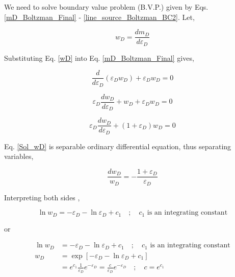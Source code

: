 \documentclass{llncs}
\numberwithin{equation}{section}
\numberwithin{figure}{section}
\numberwithin{table}{section}
\begin{document}
    We need to solve boundary value problem (B.V.P.) given by Eqs. \ref{mD_Boltzman_Final} - \ref{line_source_Boltzman_BC2}. Let,

    \begin{equation}
        {{w}_{D}}=\frac{d{{m}_{D}}}{d{{\varepsilon }_{D}}}
        \label{wD}
    \end{equation}

    Substituting Eq. \ref{wD} into Eq. \ref{mD_Boltzman_Final} gives,

    \begin{equation*}
        \frac{d}{d{{\varepsilon }_{D}}}\left( {{\varepsilon }_{D}}{{w}_{D}} \right)+{{\varepsilon }_{D}}{{w}_{D}}=0
    \end{equation*}

    \begin{equation*}
        {{\varepsilon }_{D}}\frac{d{{w}_{D}}}{d{{\varepsilon }_{D}}}+{{w}_{D}}+{{\varepsilon }_{D}}{{w}_{D}}=0
    \end{equation*}

    \begin{equation}
        {{\varepsilon }_{D}}\frac{d{{w}_{D}}}{d{{\varepsilon }_{D}}}+\left( 1+{{\varepsilon }_{D}} \right){{w}_{D}}=0
        \label{Sol_wD}
    \end{equation}

    Eq. \ref{Sol_wD} is separable ordinary differential equation, thus separating variables, 

    \begin{equation}
        \frac{d{{w}_{D}}}{{{w}_{D}}}=-\frac{1+{{\varepsilon }_{D}}}{{{\varepsilon }_{D}}}
        \label{Sol_wD_1}
    \end{equation}

    Interpreting both sides ,

    \begin{equation*}
    \ln {{w}_{D}}=-{{\varepsilon }_{D}}-\ln {{\varepsilon }_{D}}+{{c}_{1}}\quad ;\quad {{c}_{1}}\text{ is an integrating constant}
    \end{equation*}

    or

    \begin{equation*}
    \begin{split}
      \ln {{w}_{D}}&=-{{\varepsilon }_{D}}-\ln {{\varepsilon }_{D}}+{{c}_{1}}\quad ;\quad {{c}_{1}}\text{ is an integrating constant} \\
     {{w}_{D}}&=\exp \left[ -{{\varepsilon }_{D}}-\ln {{\varepsilon }_{D}}+{{c}_{1}} \right] \\
    & ={{e}^{{{c}_{1}}}}\frac{1}{{{\varepsilon }_{D}}}{{e}^{-{{\varepsilon }_{D}}}}=\frac{c}{{{\varepsilon }_{D}}}{{e}^{-{{\varepsilon }_{D}}}}\quad ;\quad c={{e}^{{{c}_{1}}}} \\
    \end{split}
    \end{equation*}
\end{document}
